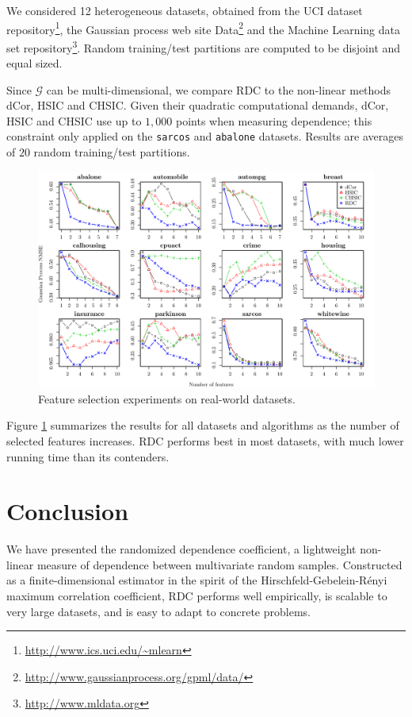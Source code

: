 \documentclass{article}
\begin{document}
We considered 12 heterogeneous datasets, obtained from the UCI dataset
repository\footnote{\url{http://www.ics.uci.edu/~mlearn}}, the Gaussian process
web site Data\footnote{\url{http://www.gaussianprocess.org/gpml/data/}} and the
Machine Learning data set repository\footnote{\url{http://www.mldata.org}}.
Random training/test partitions are computed to be disjoint and equal sized.

Since $\mathcal{G}$ can be multi-dimensional, we compare RDC to the non-linear
methods dCor, HSIC and CHSIC. Given their quadratic computational demands, dCor,
HSIC and CHSIC use up to $1,000$ points when measuring dependence; this
constraint only applied on the \texttt{sarcos} and \texttt{abalone} datasets.
Results are averages of $20$ random training/test partitions.

\begin{figure}[h!]
  \includegraphics[width=\textwidth]{figures/real_sin.pdf}
  \caption{Feature selection experiments on real-world datasets.}
  \label{fig:featsel}
\end{figure}

Figure \ref{fig:featsel} summarizes the results for all datasets and algorithms
as the number of selected features increases. RDC performs best in most
datasets, with much lower running time than its
contenders.

\section{Conclusion}
\label{sec:conclusion}

We have presented the randomized dependence coefficient, a lightweight
non-linear measure of dependence between multivariate random samples.
Constructed as a finite-dimensional estimator in the spirit of the
Hirschfeld-Gebelein-R\'enyi maximum correlation coefficient, RDC performs well
empirically, is scalable to very large datasets, and is easy to adapt to concrete
problems. 
\end{document}
